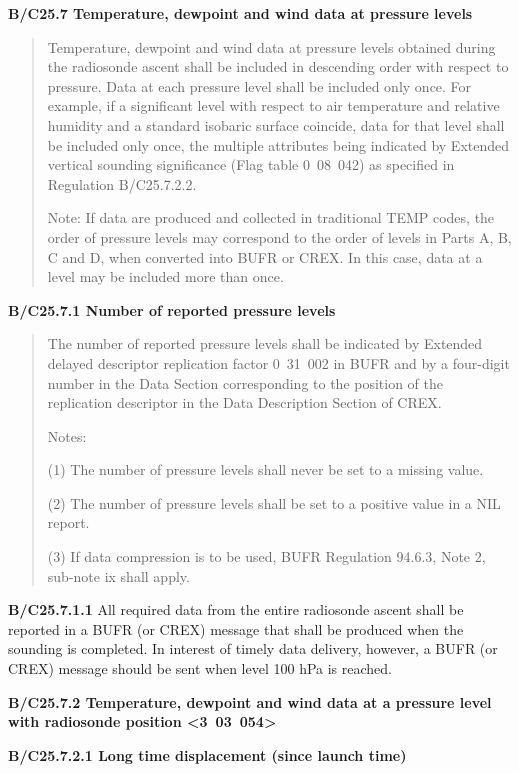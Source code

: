 \textbf{B/C25.7 Temperature, dewpoint and wind data at pressure levels}

\begin{quote}
Temperature, dewpoint and wind data at pressure levels obtained during the radiosonde ascent shall be included in descending order with respect to pressure. Data at each pressure level shall be included only once. For example, if a significant level with respect to air temperature and relative humidity and a standard isobaric surface coincide, data for that level shall be included only once, the multiple attributes being indicated by Extended vertical sounding significance (Flag table 0~08~042) as specified in Regulation B/C25.7.2.2.

Note: If data are produced and collected in traditional TEMP codes, the order of pressure levels may correspond to the order of levels in Parts A, B, C and D, when converted into BUFR or CREX. In this case, data at a level may be included more than once.
\end{quote}

\textbf{B/C25.7.1 Number of reported pressure levels}

\begin{quote}
The number of reported pressure levels shall be indicated by Extended delayed descriptor replication factor 0~31~002 in BUFR and by a four-digit number in the Data Section corresponding to the position of the replication descriptor in the Data Description Section of CREX.

Notes:

(1) The number of pressure levels shall never be set to a missing value.

(2) The number of pressure levels shall be set to a positive value in a NIL report.

(3) If data compression is to be used, BUFR Regulation 94.6.3, Note 2, sub-note ix shall apply.
\end{quote}

\textbf{B/C25.7.1.1} All required data from the entire radiosonde ascent shall be reported in a BUFR (or CREX) message that shall be produced when the sounding is completed. In interest of timely data delivery, however, a BUFR (or CREX) message should be sent when level 100 hPa is reached.

\textbf{B/C25.7.2 Temperature, dewpoint and wind data at a pressure level with radiosonde position \textless3~03~054\textgreater{}}

\textbf{B/C25.7.2.1 Long time displacement (since launch time)}

